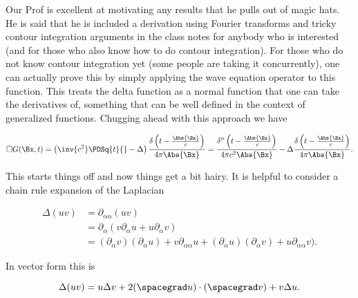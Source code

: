 %
%

Our Prof is excellent at motivating any results that he pulls out of magic hats.  He is said that he is included a derivation using Fourier transforms and tricky contour integration arguments in the class notes for anybody who is interested (and for those who also know how to do contour integration).  For those who do not know contour integration yet (some people are taking it concurrently), one can actually prove this by simply applying the wave equation operator to this function.  This treats the delta function as a normal function that one can take the derivatives of, something that can be well defined in the context of generalized functions.  Chugging ahead with this approach we have

\begin{equation}\label{eqn:relativisticElectrodynamicsL18:110}
\square G(\Bx, t)
=
\left(\inv{c^2} \PDSq{t}{} - \Delta\right)
\frac{\delta\left(t - \frac{\Abs{\Bx}}{c}\right)}{4 \pi \Abs{\Bx} }
=
\frac{\delta''\left(t - \frac{\Abs{\Bx}}{c}\right)}{4 \pi c^2 \Abs{\Bx} }
- \Delta \frac{\delta\left(t - \frac{\Abs{\Bx}}{c}\right)}{4 \pi \Abs{\Bx} }.
\end{equation}

This starts things off and now things get a bit hairy.  It is helpful to consider a chain rule expansion of the Laplacian

\begin{equation}\label{eqn:relativisticElectrodynamicsL18:760}
\begin{aligned}
\Delta (u v)
&=
\partial_{\alpha\alpha} (u v) \\
&=
\partial_{\alpha} (
v \partial_\alpha u
+ u\partial_\alpha v
) \\
&=
(\partial_\alpha v) (\partial_\alpha u ) + v \partial_{\alpha\alpha} u
+(\partial_\alpha u) (\partial_\alpha v ) + u \partial_{\alpha\alpha} v
).
\end{aligned}
\end{equation}

In vector form this is

\begin{equation}\label{eqn:relativisticElectrodynamicsL18:130}
\Delta (u v) = u \Delta v + 2 (\spacegrad u) \cdot (\spacegrad v) + v \Delta u.
\end{equation}

